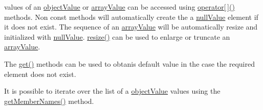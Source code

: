 values of an \hyperlink{namespace_json_a7d654b75c16a57007925868e38212b4eae8386dcfc36d1ae897745f7b4f77a1f6}{object\-Value} or \hyperlink{namespace_json_a7d654b75c16a57007925868e38212b4eadc8f264f36b55b063c78126b335415f4}{array\-Value} can be accessed using \hyperlink{protocol_json_1_1_j_s_o_n___a_p_i_afde1c2fbf32013aa59a1cf1d34d772e4}{operator\mbox{[}$\,$\mbox{]}()} methods. Non const methods will automatically create the a \hyperlink{namespace_json_a7d654b75c16a57007925868e38212b4ea7d9899633b4409bd3fc107e6737f8391}{null\-Value} element if it does not exist. The sequence of an \hyperlink{namespace_json_a7d654b75c16a57007925868e38212b4eadc8f264f36b55b063c78126b335415f4}{array\-Value} will be automatically resize and initialized with \hyperlink{namespace_json_a7d654b75c16a57007925868e38212b4ea7d9899633b4409bd3fc107e6737f8391}{null\-Value}. \hyperlink{protocol_json_1_1_j_s_o_n___a_p_i_ab50185f6fb23e943d6af6fbac8ffde7a}{resize()} can be used to enlarge or truncate an \hyperlink{namespace_json_a7d654b75c16a57007925868e38212b4eadc8f264f36b55b063c78126b335415f4}{array\-Value}.

The \hyperlink{protocol_json_1_1_j_s_o_n___a_p_i_a9d2d6f0eee92a5f5f5a671a0aecab038}{get()} methods can be used to obtanis default value in the case the required element does not exist.

It is possible to iterate over the list of a \hyperlink{namespace_json_a7d654b75c16a57007925868e38212b4eae8386dcfc36d1ae897745f7b4f77a1f6}{object\-Value} values using the \hyperlink{protocol_json_1_1_j_s_o_n___a_p_i_a0c5199d4810f25527d0fba6833b7b85b}{get\-Member\-Names()} method.

